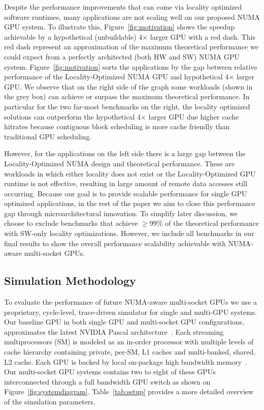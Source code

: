 Despite the performance improvements that can come via locality optimized 
software runtimes, many applications are not scaling well on our proposed NUMA 
GPU system. To illustrate this, Figure~\ref{fig:motivation} shows the speedup 
achievable by a hypothetical (unbuildable) 4$\times$ larger GPU with 
a red dash. This red dash represent an approximation of the 
maximum theoretical performance we could expect from a perfectly architected 
(both HW and SW) NUMA GPU system. Figure~\ref{fig:motivation} sorts the 
applications by the gap between relative performance of the Locality-Optimized 
NUMA GPU and hypothetical 4$\times$ larger GPU. We observe that on the right 
side of the graph some workloads (shown in the grey box) can achieve or surpass 
the maximum theoretical performance. In particular for the two far-most 
benchmarks on the right, the locality optimized solutions can outperform the 
hypothetical 4$\times$ larger GPU due higher cache hitrates because contiguous block 
scheduling is more cache friendly than traditional GPU scheduling.

However, for the applications on the left side there is a large gap between the 
Locality-Optimized NUMA design and theoretical performance. These are workloads 
in which either locality does not exist or the Locality-Optimized GPU runtime is 
not effective, resulting in large amount of remote data accesses still 
occurring.  Because our goal is to provide scalable performance for single GPU 
optimized applications, in the rest of the paper we aim to close this 
performance gap through microarchitectural innovation. To simplify later 
discussion, we choose to exclude benchmarks that achieve $\geq$99\% of the 
theoretical performance with SW-only locality optimizations. However, we include 
all benchmarks in our final results to show the overall performance scalability 
achievable with NUMA-aware multi-socket GPUs.
 
\subsection{Simulation Methodology}
\label{sec:methodology}

To evaluate the performance of future NUMA-aware multi-socket GPUs we use a 
proprietary, cycle-level, trace-driven simulator for single and multi-GPU 
systems. Our baseline GPU in both single GPU and multi-socket GPU 
configurations, approximates the latest NVIDIA Pascal 
architecture~\cite{pascal-tesla-wp}. Each streaming multiprocessors (SM) is 
modeled as an in-order processor with multiple levels of cache hierarchy 
containing private, per-SM, L1 caches and multi-banked, shared, L2 cache. Each 
GPU is backed by local on-package high bandwidth memory~\cite{HBM}. Our 
multi-socket GPU systems contains two to eight of these GPUs interconnected 
through a full bandwidth GPU switch as shown on Figure~\ref{fig:systemdiagram}. 
Table~\ref{tab:setup} provides a more detailed overview of the simulation 
parameters.


